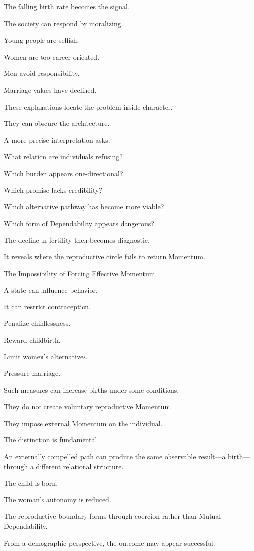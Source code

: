 The falling birth rate becomes the signal.

The society can respond by moralizing.

Young people are selfish.

Women are too career-oriented.

Men avoid responsibility.

Marriage values have declined.

These explanations locate the problem inside character.

They can obscure the architecture.

A more precise interpretation asks:

What relation are individuals refusing?

Which burden appears one-directional?

Which promise lacks credibility?

Which alternative pathway has become more viable?

Which form of Dependability appears dangerous?

The decline in fertility then becomes diagnostic.

It reveals where the reproductive circle fails to return Momentum.

The Impossibility of Forcing Effective Momentum

A state can influence behavior.

It can restrict contraception.

Penalize childlessness.

Reward childbirth.

Limit women’s alternatives.

Pressure marriage.

Such measures can increase births under some conditions.

They do not create voluntary reproductive Momentum.

They impose external Momentum on the individual.

The distinction is fundamental.

An externally compelled path can produce the same observable result—a birth—through a different relational structure.

The child is born.

The woman’s autonomy is reduced.

The reproductive boundary forms through coercion rather than Mutual Dependability.

From a demographic perspective, the outcome may appear successful.


